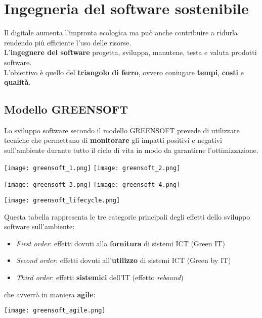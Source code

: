\newpage
\section{Ingegneria del software sostenibile}
Il digitale aumenta l'impronta ecologica ma può anche contribuire a ridurla rendendo più efficiente l'uso delle risorse.\\
L'\textbf{ingegnere del software} progetta, sviluppa, manutene, testa e valuta prodotti software.\\
L'obiettivo è quello del \textbf{triangolo di ferro}, ovvero coniugare \textbf{tempi}, \textbf{costi} e \textbf{qualità}.

\subsection{Modello GREENSOFT}
\begin{definition}[GREENSOFT]
	Lo sviluppo software secondo il modello GREENSOFT prevede di utilizzare tecniche che permettano di \textbf{monitorare} gli impatti positivi e negativi sull'ambiente durante tutto il ciclo di vita in modo da garantirne l'ottimizzazione.
\end{definition}
\begin{center}
	\texttt{[image: greensoft\_1.png]}
	\texttt{[image: greensoft\_2.png]}
\end{center}
\begin{center}
	\texttt{[image: greensoft\_3.png]}
	\texttt{[image: greensoft\_4.png]}
\end{center}

\begin{center}
	\texttt{[image: greensoft\_lifecycle.png]}
\end{center}

\noindent Questa tabella rappresenta le tre categorie principali degli effetti dello sviluppo software sull'ambiente:
\begin{itemize}
	\item \emph{First order}: effetti dovuti alla \textbf{fornitura} di sistemi ICT (Green IT)
	\item \emph{Second order}: effetti dovuti all'\textbf{utilizzo} di sistemi ICT (Green by IT)
	\item \emph{Third order}: effetti \textbf{sistemici} dell'IT (effetto \emph{rebound})
\end{itemize}
che avverrà in maniera \textbf{agile}:
\begin{center}
	\texttt{[image: greensoft\_agile.png]}
\end{center}
